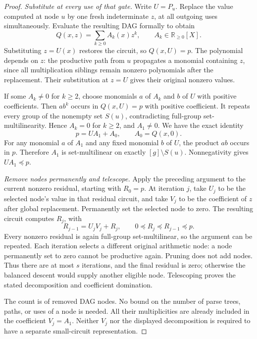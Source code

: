 \documentclass[11pt]{article}
\theoremstyle{definition}
\theoremstyle{remark}
\numberwithin{equation}{section}
\begin{document}
\begin{proof}
\emph{Substitute at every use of that gate.}
Write \(U=P_u\). Replace the value computed at node \(u\) by
one fresh indeterminate \(z\), at all outgoing uses simultaneously.
Evaluate the resulting DAG formally to obtain
\[
 Q(x,z)=\sum_{k\ge0}A_k(x)z^k,\qquad A_k\in\mathbb R_{\ge0}[X].
\]
Substituting \(z=U(x)\) restores the circuit, so \(Q(x,U)=p\).
The polynomial depends on \(z\): the productive path from \(u\)
propagates a monomial containing \(z\), since all multiplication
siblings remain nonzero polynomials after the replacement.
Their substitution at \(z=U\) gives their original nonzero values.

If some \(A_k\ne0\) for \(k\ge2\), choose monomials \(a\) of
\(A_k\) and \(b\) of \(U\) with positive coefficients.
Then \(ab^k\) occurs in \(Q(x,U)=p\) with positive coefficient.
It repeats every group of the nonempty set \(S(u)\), contradicting
full-group set-multilinearity. Hence \(A_k=0\) for \(k\ge2\),
and \(A_1\ne0\). We have the exact identity
\[
 p=UA_1+A_0,\qquad A_0=Q(x,0).
\]
For any monomial \(a\) of \(A_1\) and any fixed monomial \(b\)
of \(U\), the product \(ab\) occurs in \(p\). Therefore \(A_1\)
is set-multilinear on exactly \([g]\setminus S(u)\).
Nonnegativity gives \(UA_1\preceq p\).

\emph{Remove nodes permanently and telescope.}
Apply the preceding argument to the current nonzero residual,
starting with \(R_0=p\). At iteration \(j\), take \(U_j\) to
be the selected node's value in that residual circuit, and take
\(V_j\) to be the coefficient of \(z\) after global replacement.
Permanently set the selected node to zero. The resulting circuit
computes \(R_j\), with
\[
 R_{j-1}=U_jV_j+R_j,\qquad
 0\preceq R_j\preceq R_{j-1}\preceq p.
\]
Every nonzero residual is again full-group set-multilinear, so
the argument can be repeated. Each iteration selects a different
original arithmetic node: a node permanently set to zero cannot
be productive again. Pruning does not add nodes. Thus there are
at most \(s\) iterations, and the final residual is zero; otherwise
the balanced descent would supply another eligible node.
Telescoping proves the stated decomposition and coefficient domination.

The count is of removed DAG nodes. No bound on the number of
parse trees, paths, or uses of a node is needed. All their
multiplicities are already included in the coefficient \(V_j=A_1\).
Neither \(V_j\) nor the displayed decomposition is required to
have a separate small-circuit representation.
\end{proof}
\end{document}
